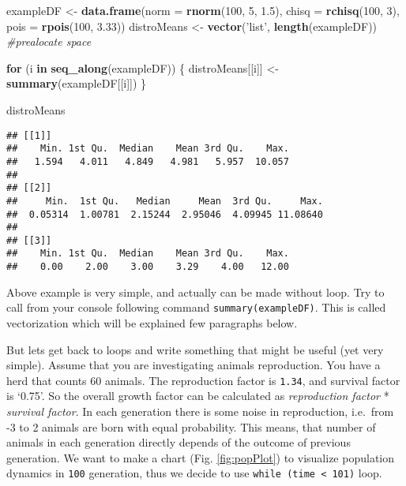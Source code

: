 \documentclass[]{book}
\newenvironment{Shaded}{\begin{snugshade}}{\end{snugshade}}
\newcommand{\KeywordTok}[1]{\textcolor[rgb]{0.13,0.29,0.53}{\textbf{#1}}}
\newcommand{\DataTypeTok}[1]{\textcolor[rgb]{0.13,0.29,0.53}{#1}}
\newcommand{\DecValTok}[1]{\textcolor[rgb]{0.00,0.00,0.81}{#1}}
\newcommand{\FloatTok}[1]{\textcolor[rgb]{0.00,0.00,0.81}{#1}}
\newcommand{\StringTok}[1]{\textcolor[rgb]{0.31,0.60,0.02}{#1}}
\newcommand{\CommentTok}[1]{\textcolor[rgb]{0.56,0.35,0.01}{\textit{#1}}}
\newcommand{\ControlFlowTok}[1]{\textcolor[rgb]{0.13,0.29,0.53}{\textbf{#1}}}
\newcommand{\NormalTok}[1]{#1}
\theoremstyle{definition}
\theoremstyle{definition}
\theoremstyle{definition}
\theoremstyle{remark}
\begin{document}
\begin{Shaded}
\begin{Highlighting}[]
\NormalTok{exampleDF <-}\StringTok{ }\KeywordTok{data.frame}\NormalTok{(}\DataTypeTok{norm =} \KeywordTok{rnorm}\NormalTok{(}\DecValTok{100}\NormalTok{, }\DecValTok{5}\NormalTok{, }\FloatTok{1.5}\NormalTok{),}
                        \DataTypeTok{chisq =} \KeywordTok{rchisq}\NormalTok{(}\DecValTok{100}\NormalTok{, }\DecValTok{3}\NormalTok{),}
                        \DataTypeTok{pois =} \KeywordTok{rpois}\NormalTok{(}\DecValTok{100}\NormalTok{, }\FloatTok{3.33}\NormalTok{))}
\NormalTok{distroMeans <-}\StringTok{ }\KeywordTok{vector}\NormalTok{(}\StringTok{'list'}\NormalTok{, }\KeywordTok{length}\NormalTok{(exampleDF)) }\CommentTok{#prealocate space}

\ControlFlowTok{for}\NormalTok{ (i }\ControlFlowTok{in} \KeywordTok{seq_along}\NormalTok{(exampleDF)) \{}
\NormalTok{  distroMeans[[i]] <-}\StringTok{ }\KeywordTok{summary}\NormalTok{(exampleDF[[i]])}
\NormalTok{\}}

\NormalTok{distroMeans}
\end{Highlighting}
\end{Shaded}

\begin{verbatim}
## [[1]]
##    Min. 1st Qu.  Median    Mean 3rd Qu.    Max. 
##   1.594   4.011   4.849   4.981   5.957  10.057 
## 
## [[2]]
##     Min.  1st Qu.   Median     Mean  3rd Qu.     Max. 
##  0.05314  1.00781  2.15244  2.95046  4.09945 11.08640 
## 
## [[3]]
##    Min. 1st Qu.  Median    Mean 3rd Qu.    Max. 
##    0.00    2.00    3.00    3.29    4.00   12.00
\end{verbatim}

Above example is very simple, and actually can be made without loop. Try
to call from your console following command \texttt{summary(exampleDF)}.
This is called vectorization which will be explained few paragraphs
below.

But lets get back to loops and write something that might be useful (yet
very simple). Assume that you are investigating animals reproduction.
You have a herd that counts 60 animals. The reproduction factor is
\texttt{1.34}, and survival factor is `0.75'. So the overall growth
factor can be calculated as \emph{reproduction factor} * \emph{survival
factor}. In each generation there is some noise in reproduction,
i.e.~from -3 to 2 animals are born with equal probability. This means,
that number of animals in each generation directly depends of the
outcome of previous generation. We want to make a chart (Fig.
\ref{fig:popPlot}) to visualize population dynamics in \texttt{100}
generation, thus we decide to use
\texttt{while\ (time\ \textless{}\ 101)} loop.
\end{document}
